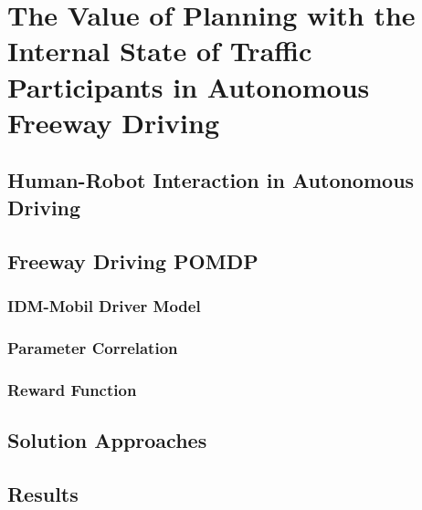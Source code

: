 \chapter{The Value of Planning with the Internal State of Traffic Participants in Autonomous Freeway Driving}

\section{Human-Robot Interaction in Autonomous Driving}

\section{Freeway Driving POMDP}

\subsection{IDM-Mobil Driver Model}
\subsection{Parameter Correlation}
\subsection{Reward Function}

\section{Solution Approaches}

\section{Results}
